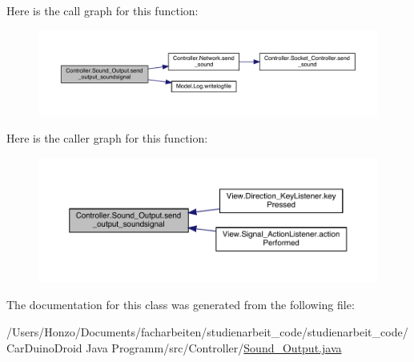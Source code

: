 Here is the call graph for this function\+:
\nopagebreak
\begin{figure}[H]
\begin{center}
\leavevmode
\includegraphics[width=350pt]{class_controller_1_1_sound___output_a614fad3661aebdc0dc122b4dfdbd02b0_cgraph}
\end{center}
\end{figure}




Here is the caller graph for this function\+:
\nopagebreak
\begin{figure}[H]
\begin{center}
\leavevmode
\includegraphics[width=350pt]{class_controller_1_1_sound___output_a614fad3661aebdc0dc122b4dfdbd02b0_icgraph}
\end{center}
\end{figure}




The documentation for this class was generated from the following file\+:\begin{DoxyCompactItemize}
\item 
/\+Users/\+Honzo/\+Documents/facharbeiten/studienarbeit\+\_\+code/studienarbeit\+\_\+code/\+Car\+Duino\+Droid Java Programm/src/\+Controller/\hyperlink{_sound___output_8java}{Sound\+\_\+\+Output.\+java}\end{DoxyCompactItemize}
